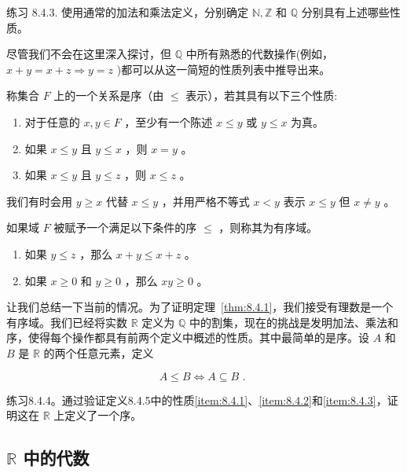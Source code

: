 练习 8.4.3. 使用通常的加法和乘法定义，分别确定 \(\mathbb{N},\mathbb{Z}\) 和 \(\mathbb{Q}\) 分别具有上述哪些性质。

尽管我们不会在这里深入探讨，但 \(\mathbb{Q}\) 中所有熟悉的代数操作(例如， \(x + y = x + z\Rightarrow y = z\) )都可以从这一简短的性质列表中推导出来。

\begin{Def}
  \label{def:8.4.5}
  称集合 \(F\) 上的一个关系是序（由 \(\leq\) 表示），若其具有以下三个性质:
\begin{enumerate}[label = (o\arabic*)]
\item\label{item:8.4.1} 对于任意的 \(x,y \in  F\) ，至少有一个陈述 \(x \leq  y\) 或 \(y \leq  x\) 为真。

\item\label{item:8.4.2}  如果 \(x \leq  y\) 且 \(y \leq  x\) ，则 \(x = y\) 。

\item\label{item:8.4.3}  如果 \(x \leq  y\) 且 \(y \leq  z\) ，则 \(x \leq  z\) 。
\end{enumerate}
\end{Def}


我们有时会用 \(y \geq  x\) 代替 \(x \leq  y\) ，并用严格不等式 \(x < y\) 表示 \(x \leq  y\) 但 \(x \neq  y\) 。

如果域 \(F\) 被赋予一个满足以下条件的序 \(\leq\) ，则称其为有序域。
\begin{enumerate}[label=(o\arabic*), start=4]
\item\label{item:8.4.4} 如果 \(y \leq  z\) ，那么 \(x + y \leq  x + z\) 。

\item\label{item:8.4.5} 如果 \(x \geq  0\) 和 \(y \geq  0\) ，那么 \({xy} \geq  0\) 。
\end{enumerate}


让我们总结一下当前的情况。为了证明定理~\ref{thm:8.4.1}，我们接受有理数是一个有序域。我们已经将实数 \(\mathbb{R}\) 定义为 \(\mathbb{Q}\) 中的割集，现在的挑战是发明加法、乘法和序，使得每个操作都具有前两个定义中概述的性质。其中最简单的是序。设 \(A\) 和 \(B\) 是 \(\mathbb{R}\) 的两个任意元素，定义

\[
A \leq  B \Leftrightarrow A \subseteq  B\text{ . }
\]

练习8.4.4。通过验证定义8.4.5中的性质\ref{item:8.4.1}、\ref{item:8.4.2}和\ref{item:8.4.3}，证明这在 \(\mathbb{R}\) 上定义了一个序。

\subsection{\(\mathbb{R}\) 中的代数}

